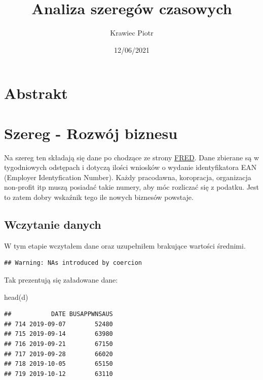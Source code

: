 \documentclass[
  polish,
]{article}
\title{Analiza szeregów czasowych}
\author{Krawiec Piotr}
\date{12/06/2021}
\newenvironment{Shaded}{\begin{snugshade}}{\end{snugshade}}
\newcommand{\FunctionTok}[1]{\textcolor[rgb]{0.00,0.00,0.00}{#1}}
\newcommand{\NormalTok}[1]{#1}
\begin{document}
\maketitle

{
\setcounter{tocdepth}{3}
\tableofcontents
}
\hypertarget{abstrakt}{%
\section{Abstrakt}\label{abstrakt}}

\hypertarget{szereg---rozwuxf3j-biznesu}{%
\section{Szereg - Rozwój biznesu}\label{szereg---rozwuxf3j-biznesu}}

Na szereg ten składają się dane po chodzące ze strony
\href{https://fred.stlouisfed.org/series/BUSAPPWNSAUS}{FRED}. Dane
zbierane są w tygodniowych odstępach i dotyczą ilości wniosków o wydanie
identyfikatora EAN (Employer Identyfication Number). Każdy pracodawna,
koropracja, organizacja non-profit itp muszą posiadać takie numery, aby
móc rozliczać się z podatku. Jest to zatem dobry wskaźnik tego ile
nowych biznesów powstaje.

\hypertarget{wczytanie-danych}{%
\subsection{Wczytanie danych}\label{wczytanie-danych}}

W tym etapie wczytałem dane oraz uzupełniłem brakujące wartości
średnimi.

\begin{verbatim}
## Warning: NAs introduced by coercion
\end{verbatim}

Tak prezentują się załadowane dane:

\begin{Shaded}
\begin{Highlighting}[]
\FunctionTok{head}\NormalTok{(d)}
\end{Highlighting}
\end{Shaded}

\begin{verbatim}
##           DATE BUSAPPWNSAUS
## 714 2019-09-07        52480
## 715 2019-09-14        63980
## 716 2019-09-21        67150
## 717 2019-09-28        66020
## 718 2019-10-05        65150
## 719 2019-10-12        63110
\end{verbatim}
\end{document}
